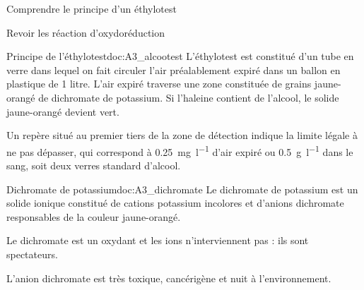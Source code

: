 \teteTermStssRout
{}

\begin{objectifs}
  \item Comprendre le principe d'un éthylotest
  \item Revoir les réaction d'oxydoréduction
\end{objectifs}


\begin{doc}{Principe de l'éthylotest}{doc:A3_alcootest}
  L'éthylotest est constitué d'un tube en verre dans lequel on fait circuler l'air préalablement expiré dans un ballon en plastique de 1 litre.  
  L'air expiré traverse une zone constituée de grains jaune-orangé de dichromate de potassium.
  Si l'haleine contient de l'alcool, le solide jaune-orangé devient vert.

  Un repère situé au premier tiers de la zone de détection indique la limite légale à ne pas dépasser, qui correspond à \qty{0,25}{\milli\g\per\litre} d’air expiré ou \qty{0.5}{\g\per\litre} dans le sang, soit deux verres standard d'alcool.

  \begin{center}
  \end{center}
\end{doc}

\begin{doc}{Dichromate de potassium}{doc:A3_dichromate}
  Le dichromate de potassium  est un solide ionique constitué de cations potassium \ionPotassium incolores et d'anions dichromate responsables de la couleur jaune-orangé.
  
  Le dichromate est un oxydant et les ions \ionPotassium n'interviennent pas : ils sont spectateurs.

  L'anion dichromate est très toxique, cancérigène et nuit à l'environnement.
  \begin{center}
  \end{center}
\end{doc}

